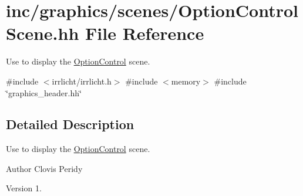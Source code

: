 \hypertarget{OptionControlScene_8hh}{}\section{inc/graphics/scenes/\+Option\+Control\+Scene.hh File Reference}
\label{OptionControlScene_8hh}


Use to display the \hyperlink{classOptionControl}{Option\+Control} scene.  


{\ttfamily \#include $<$irrlicht/irrlicht.\+h$>$}\newline
{\ttfamily \#include $<$memory$>$}\newline
{\ttfamily \#include \char`\"{}graphics\+\_\+header.\+hh\char`\"{}}\newline


\subsection{Detailed Description}
Use to display the \hyperlink{classOptionControl}{Option\+Control} scene. 

\begin{DoxyAuthor}{Author}
Clovis Peridy 
\end{DoxyAuthor}
\begin{DoxyVersion}{Version}
1. 
\end{DoxyVersion}
